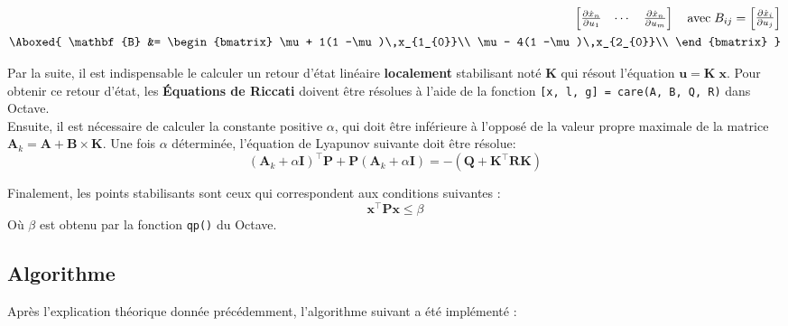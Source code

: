 \documentclass[../CSC_5RO16_TA_TP4.tex]{subfiles}
\begin{document}
\begin{multicols}{2}
\begin{equation}
\begin{aligned}
\begin{bmatrix}
                \frac{\partial \dot{x}_{n}}{\partial u_{1}} & \cdots & \frac{\partial \dot{x}_{n}}{\partial u_{m}}\\
            \end{bmatrix}
            \quad\text{avec}\;
            B_{ij} =
            \begin{bmatrix}
                \frac{\partial \dot{x}_{i}}{\partial u_{j}}
            \end{bmatrix}\\
            \Aboxed{
                \mathbf{B} &=
                \begin{bmatrix}
                    \mu + 1(1 -\mu)\,x_{1_{0}}\\
                    \mu - 4(1 -\mu)\,x_{2_{0}}\\
                \end{bmatrix}
            }
        \end{aligned}
    \end{equation}
\end{multicols}
\noindent Par la suite, il est indispensable le calculer un retour d'état linéaire \textbf{localement} stabilisant noté $\mathbf{K}$ qui résout l'équation $\mathbf{u} = \mathbf{K}\;\mathbf{x}$. Pour obtenir ce retour d'état, les \textbf{Équations de Riccati} doivent être résolues à l'aide de la fonction \texttt{[x, l, g] = care(A, B, Q, R)} dans Octave.\\

\noindent Ensuite, il est nécessaire de calculer la constante positive $\alpha$, qui doit être inférieure à l'opposé de la valeur propre maximale de la matrice $\mathbf{A}_{k} = \mathbf{A} + \mathbf{B}\times\mathbf{K}$. Une fois $\alpha$ déterminée, l'équation de Lyapunov suivante doit être résolue:
\begin{equation}
    \left(\mathbf{A}_{k} + \alpha\mathbf{I}\right)^\top \mathbf{P} +
    \mathbf{P}\left(\mathbf{A}_{k} + \alpha\mathbf{I}\right) =
    -\left(\mathbf{Q} + \mathbf{K}^\top\mathbf{R}\mathbf{K}\right)
\end{equation}

\noindent Finalement, les points stabilisants sont ceux qui correspondent aux conditions suivantes :
\begin{equation}
    \boxed{
        \mathbf{x}^\top \mathbf{P} \mathbf{x} \le \beta
    }
\end{equation}
\noindent Où $\beta$ est obtenu par la fonction \texttt{qp()} du Octave.


\subsection{Algorithme}
\noindent Après l’explication théorique donnée précédemment, l’algorithme suivant a été implémenté :
\end{document}
